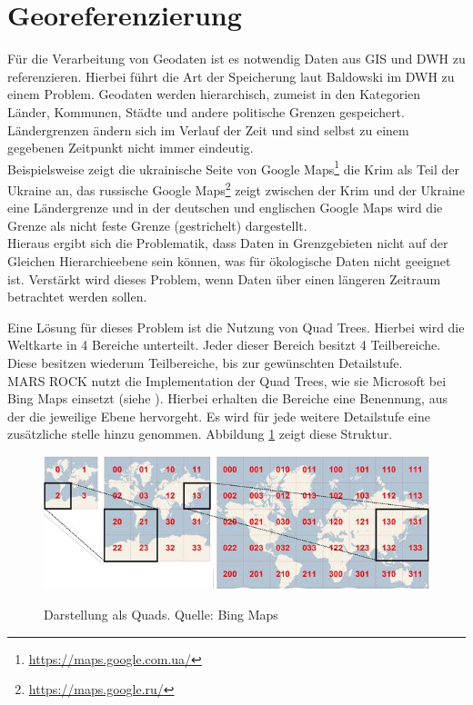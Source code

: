 \documentclass[10pt,conference,compsocconf]{IEEEtran}
\begin{document}
\section{Georeferenzierung}
Für die Verarbeitung von Geodaten ist es notwendig Daten aus GIS und DWH zu referenzieren. Hierbei führt die Art der Speicherung laut Baldowski\cite{mariuszMaster} im DWH zu einem Problem. Geodaten werden hierarchisch, zumeist in den Kategorien Länder, Kommunen, Städte und andere politische Grenzen gespeichert. Ländergrenzen ändern sich im Verlauf der Zeit und sind selbst zu einem gegebenen Zeitpunkt nicht immer eindeutig.\\
Beispielsweise zeigt die ukrainische Seite von Google Maps\footnote{\url{https://maps.google.com.ua/}} die Krim als Teil der Ukraine an, das russische Google Maps\footnote{\url{https://maps.google.ru/}} zeigt zwischen der Krim und der Ukraine eine Ländergrenze und in der deutschen und englischen Google Maps wird die Grenze als nicht feste Grenze (gestrichelt) dargestellt.\\
Hieraus ergibt sich die Problematik, dass Daten in Grenzgebieten nicht auf der Gleichen Hierarchieebene sein können, was für ökologische Daten nicht geeignet ist. Verstärkt wird dieses Problem, wenn Daten über einen längeren Zeitraum betrachtet werden sollen.\par

Eine Lösung für dieses Problem ist die Nutzung von Quad Trees\cite{quads}. Hierbei wird die Weltkarte in 4 Bereiche unterteilt. Jeder dieser Bereich besitzt 4 Teilbereiche. Diese besitzen wiederum Teilbereiche, bis zur gewünschten Detailstufe.\\
MARS ROCK nutzt die Implementation der Quad Trees, wie sie Microsoft bei Bing Maps einsetzt (siehe \cite{waldbiomasse}). Hierbei erhalten die Bereiche eine Benennung, aus der die jeweilige Ebene hervorgeht. Es wird für jede weitere Detailstufe eine zusätzliche stelle hinzu genommen. Abbildung \ref{img:bing_quads} zeigt diese Struktur.

\begin{figure}[H]
  \centering
  	\includegraphics[width=\columnwidth]{img/bing_quads}\\
  \caption[]{Darstellung als Quads. Quelle: Bing Maps\cite{waldbiomasse}}
  \label{img:bing_quads}
\end{figure}
\end{document}
